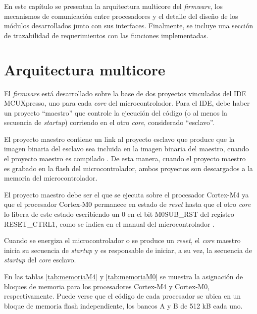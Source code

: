 En este capítulo se presentan la arquitectura multicore del \textit{firmware}, los mecanismos de comunicación entre procesadores y el detalle del diseño de los módulos desarrollados junto con sus interfaces.  Finalmente, se incluye una sección de trazabilidad de requerimientos con las funciones implementadas.


\section{Arquitectura multicore}
\label{sec:arquitectura}

El \textit{firmware} está desarrollado sobre la base de dos proyectos vinculados del IDE MCUXpresso, uno para cada \textit{core} del microcontrolador. Para el IDE, debe haber un proyecto ``maestro'' que controle la ejecución del código (o al menos la secuencia de \textit{startup}) corriendo en el otro \textit{core}, considerado ``esclavo''.  

El proyecto maestro contiene un link al proyecto esclavo que produce que la imagen binaria del esclavo sea incluida en la imagen  binaria del maestro, cuando el proyecto maestro es compilado \citep{nxp:mcuxpresso}. De esta manera, cuando el proyecto maestro es grabado en la flash del microcontrolador, ambos proyectos son descargados a la memoria del microcontrolador.

El proyecto maestro debe ser el que se ejecuta sobre el procesador Cortex-M4 ya que el procesador Cortex-M0 permanece en estado de \textit{reset} hasta que el otro \textit{core} lo libera de este estado escribiendo un 0 en el bit M0SUB\_RST del registro RESET\_CTRL1, como se indica en el manual del microcontrolador \citep{nxp:lpc4337}.

Cuando se energiza el microcontrolador o se produce un \textit{reset}, el \textit{core} maestro inicia su secuencia de \textit{startup} y es responsable de iniciar, a su vez, la secuencia de \textit{startup} del \textit{core} esclavo.  

En las tablas \ref{tab:memoriaM4} y \ref{tab:memoriaM0} se muestra la asignación de bloques de memoria para los procesadores Cortex-M4 y Cortex-M0, respectivamente.  Puede verse que el código de cada procesador se ubica en un bloque de memoria flash independiente, los bancos A y B de 512 kB cada uno.  

